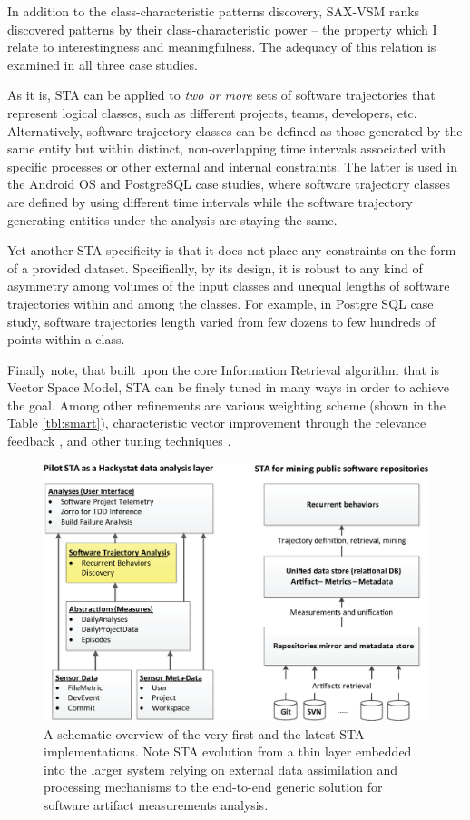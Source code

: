 In addition to the class-characteristic patterns discovery, SAX-VSM ranks discovered patterns by their class-characteristic power -- the property which I relate to interestingness and meaningfulness. The adequacy of this relation is examined in all three case studies.

As it is, STA can be applied to \textit{two or more} sets of software trajectories that represent logical classes, such as different projects, teams, developers, etc. Alternatively, software trajectory classes can be defined as those generated by the same entity but within distinct, non-overlapping time intervals associated with specific processes or other external and internal constraints. The latter is used in the Android OS and PostgreSQL case studies, where software trajectory classes are defined by using different time intervals while the software trajectory generating entities under the analysis are staying the same.

Yet another STA specificity is that it does not place any constraints on the form of a provided dataset. Specifically, by its design, it is robust to any kind of asymmetry among volumes of the input classes and unequal lengths of software trajectories within and among the classes. For example, in Postgre SQL case study, software trajectories length varied from few dozens to few hundreds of points within a class.

Finally note, that built upon the core Information Retrieval algorithm that is Vector Space Model, STA can be finely tuned in many ways in order to achieve the goal. Among other refinements are various weighting scheme (shown in the Table \ref{tbl:smart}), characteristic vector improvement through the relevance feedback \cite{salton-71}, and other tuning techniques \cite{intro_ir_Manning}.

\begin{figure}[t]
   \centering
   \includegraphics[width=145mm]{figures/STA12-schema-draft.eps}
   \caption{A schematic overview of the very first and the latest STA implementations. 
   Note STA evolution from a thin layer embedded into the larger system relying on external data assimilation and processing 
   mechanisms to the end-to-end generic solution for software artifact measurements analysis.}
   \label{fig:STA12-schema}
\end{figure}

